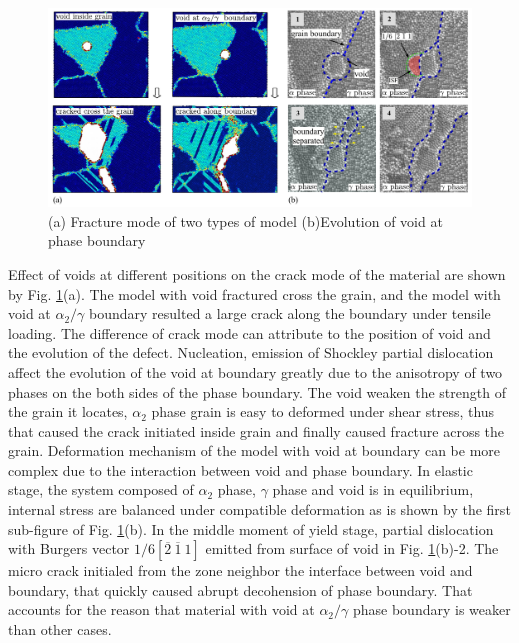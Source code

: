 \documentclass[Unknown,article,submit,moreauthors,pdftex,10pt,a4paper]{Definitions/mdpi}
\begin{document}
\begin{figure}[ht]
	\centering
	\includegraphics[width=1\linewidth]{"img/void-gb"}
	\caption{(a) Fracture mode of two types of model  (b)Evolution of void at  phase boundary}
	\label{fig:void-gb}
\end{figure}
Effect of voids at different positions on the crack mode of the material are shown by Fig. \ref{fig:void-gb}(a). The model with void fractured cross the grain, and the model with void at $\alpha_2 / \gamma$ boundary resulted a large crack along the boundary under tensile loading. The difference of crack mode can attribute to the position of void and the evolution of the defect. Nucleation, emission of Shockley partial dislocation affect the evolution of the void at boundary greatly due to the anisotropy of two phases on the both sides of the phase boundary. The void weaken the strength of the grain it locates,  $\alpha_2$ phase grain is easy to deformed under shear stress, thus that caused the crack initiated inside grain and finally caused fracture across the grain. Deformation mechanism of the model with void at boundary can be  more complex due to the interaction between void and phase boundary. In elastic stage, the system composed of $\alpha_2$ phase, $\gamma$ phase and void is in equilibrium, internal stress are balanced under compatible deformation as is shown by the first sub-figure of Fig. \ref{fig:void-gb}(b). In the middle moment of yield stage, partial dislocation with Burgers vector $1/6[\overline{2}\ \overline{1}\ 1]$ emitted from surface of void in Fig. \ref{fig:void-gb}(b)-2. The micro crack initialed from the zone neighbor  the interface between void and boundary, that quickly caused abrupt decohension of phase boundary. That accounts for the reason that material with void at $\alpha_2 / \gamma$ phase boundary is weaker than other cases. 
\end{document}
